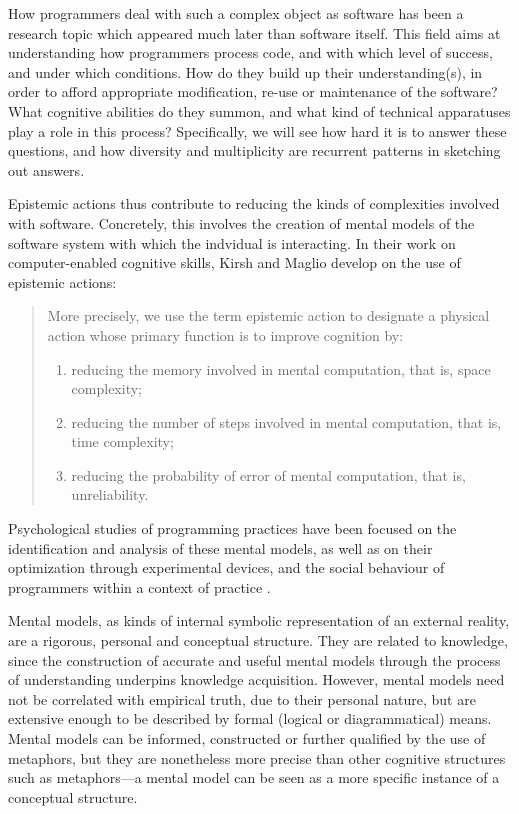 How programmers deal with such a complex object as software has been a research topic which appeared much later than software itself. This field aims at understanding how programmers process code, and with which level of success, and under which conditions. How do they build up their understanding(s), in order to afford appropriate modification, re-use or maintenance of the software? What cognitive abilities do they summon, and what kind of technical apparatuses play a role in this process? Specifically, we will see how hard it is to answer these questions, and how diversity and multiplicity are recurrent patterns in sketching out answers.

Epistemic actions thus contribute to reducing the kinds of complexities involved with software. Concretely, this involves the creation of mental models of the software system with which the indvidual is interacting. In their work on computer-enabled cognitive skills, Kirsh and Maglio develop on the use of epistemic actions:

\begin{quote}
    More precisely, we use the term epistemic action to designate a physical action whose primary function is to improve cognition by:
    \begin{enumerate}
        \item reducing the memory involved in mental computation, that is, space complexity;
        \item reducing the number of steps involved in mental computation, that is, time complexity;
        \item reducing the probability of error of mental computation, that is, unreliability.
    \end{enumerate}
    \citep{kirsh_distinguishing_1994}
\end{quote}

Psychological studies of programming practices have been focused on the identification and analysis of these mental models, as well as on their optimization through experimental devices, and the social behaviour of programmers within a context of practice \citep{weinberg_psychology_1998}.

Mental models, as kinds of internal symbolic representation of an external reality, are a rigorous, personal and conceptual structure. They are related to knowledge, since the construction of accurate and useful mental models through the process of understanding underpins knowledge acquisition. However, mental models need not be correlated with empirical truth, due to their personal nature, but are extensive enough to be described by formal (logical or diagrammatical) means. Mental models can be informed, constructed or further qualified by the use of metaphors, but they are nonetheless more precise than other cognitive structures such as metaphors—a mental model can be seen as a more specific instance of a conceptual structure.

